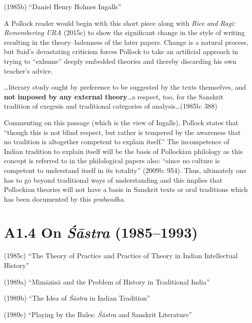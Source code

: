 {{\vspace{-.2cm}

(1985b) “Daniel Henry Holmes Ingalls”

A Pollock reader would begin with this short piece along with \textit{Rice and Ragi: Remembering URA} (2015c) to show the significant change in the style of writing resulting in the theory–ladenness of the later papers. Change is a natural process, but Said’s devastating criticism forces Pollock to take an artificial approach in trying to “exhume” deeply embedded theories and thereby discarding his own teacher’s advice.

\begin{myquote}
…literary study ought by preference to be suggested by the texts themselves, and \textbf{not imposed by any external theory}…a respect, too, for the Sanskrit tradition of exegesis and traditional categories of analysis…(1985b: 388)
\end{myquote}

Commenting on this passage (which is the view of Ingalls), Pollock states that “though this is not blind respect, but rather is tempered by the awareness that no tradition is altogether competent to explain itself.” The incompetence of Indian tradition to explain itself will be the basis of Pollockian philology as this concept is referred to in the philological papers also: “since no culture is competent to understand itself in its totality” (2009b: 954). Thus, ultimately one has to go beyond traditional ways of understanding and this implies that Pollockian theories will not have a basis in Sanskrit texts or oral traditions which has been documented by this \textit{prabandha}.

\vspace{-.3cm}

\section*{A1.4 On \textit{Śāstra} (1985–1993)}

(1985c) “The Theory of Practice and Practice of Theory in Indian Intellectual History”

(1989a) “Mīmāṁsā and the Problem of History in Traditional India”

(1989b) “The Idea of \textit{Śāstra} in Indian Tradition”

(1989c) “Playing by the Rules: \textit{Śāstra} and Sanskrit Literature”

}}
